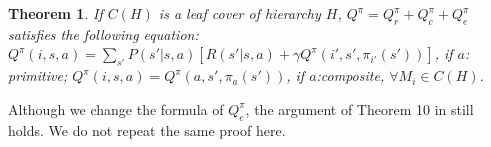 \documentclass{article} %
\newtheorem{theorem}{Theorem}
\begin{document}
\begin{theorem}
    If $C(H)$ is a leaf cover of hierarchy $H$, $Q^{\pi} = Q_r^{\pi} + Q_c^{\pi} + Q_e^{\pi}$ satisfies 
    the following equation:
    $Q^{\pi}(i, s, a) = \sum_{s'}P(s'|s, a)[R(s'|s, a) + \gamma Q^{\pi}(i', s', \pi_{i'}(s'))]$,
    if $a$: primitive; $Q^{\pi}(i, s, a) = Q^{\pi}(a, s', \pi_{a}(s'))$, if $a$:composite, $\forall M_i \in C(H)$.
    \label{thm:Bell}
\end{theorem}
Although we change the formula of $Q_e^{\pi}$, the argument of Theorem 10 in \cite{HORDQ} still holds.
We do not repeat the same proof here. 

\end{document}
